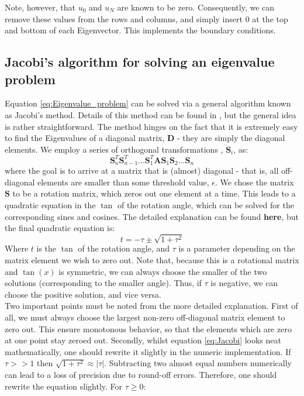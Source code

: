 \documentclass[a4paper, 10pt]{article}
\begin{document}
Note, however, that $u_0$ and $u_N$ are known to be zero. Consequently, we can remove these values from the rows and columns, and simply insert 0 at the top and bottom of each Eigenvector. This implements the boundary conditions.
\subsection{Jacobi's algorithm for solving an eigenvalue problem}\label{Eigenvalue_prob}
Equation \ref{eq:Eigenvalue_problem} can be solved via a general algorithm known as Jacobi's method. Details of this method can be found in \cite{Morten}, but the general idea is rather straightforward. The method hinges on the fact that it is extremely easy to find the Eigenvalues of a diagonal matrix, $\mathbf{D}$ - they are simply the diagonal elements. We employ a series of orthogonal transformations , $\mathbf{S}_i$, as:
$$\mathbf{S}_n^T\mathbf{S}_{n-1}^T...\mathbf{S}_1^T\mathbf{A}\mathbf{S}_1\mathbf{S}_2...\mathbf{S}_n$$
where the goal is to arrive at a matrix that is (almost) diagonal - that is, all off-diagonal elements are smaller than some threshold value, $\epsilon$. We chose the matrix $\mathbf{S}$ to be a rotation matrix, which zeros out one element at a time. This leads to a quadratic equation in the $\tan$ of the rotation angle, which can be solved for the corresponding sines and cosines. The detailed explanation can be found \textbf{here}, but the final quadratic equation is:
\begin{equation}\label{eq:Jacobi}
t=-\tau \pm \sqrt{1+\tau^2}
\end{equation} 
Where $t$ is the $\tan$ of the rotation angle, and $\tau$ is a parameter depending on the matrix element we wish to zero out. Note that, because this is a rotational matrix and $\tan(x)$ is symmetric, we can always choose the smaller of the two solutions (corresponding to the smaller angle). Thus, if $\tau$ is negative, we can choose the positive solution, and vice versa.\\
\linebreak
Two important points must be noted from the more detailed explanation.
First of all, we must always choose the largest non-zero off-diagonal matrix element to zero out. This ensure monotonous behavior, so that the elements which are zero at one point stay zeroed out. Secondly, whilst equation \ref{eq:Jacobi} looks neat mathematically, one should rewrite it slightly in the numeric implementation. If  $\tau >> 1$ then $\sqrt{1+\tau^2}\approx |\tau|$. Subtracting two almost equal numbers numerically can lead to a loss of precision due to round-off errors. Therefore, one should rewrite the equation slightly. For $\tau \geq 0$:
\end{document}
